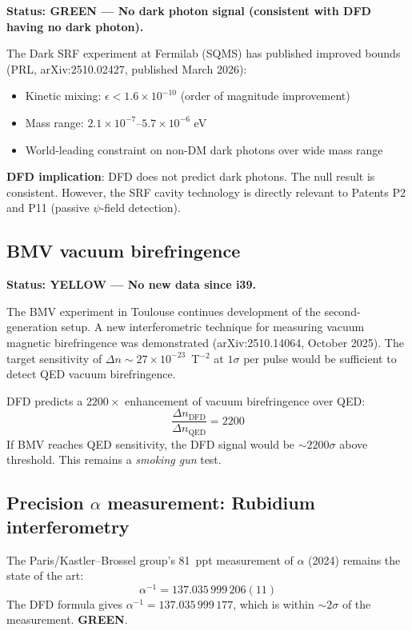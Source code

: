\documentclass[11pt,a4paper]{article}
\newcommand{\GREEN}{\textcolor{dfdgreen}{\textbf{GREEN}}}
\newcommand{\YELLOW}{\textcolor{dfdyellow}{\textbf{YELLOW}}}
\begin{document}
\textbf{Status: \GREEN{} --- No dark photon signal (consistent with DFD having no dark photon).}

The Dark SRF experiment at Fermilab (SQMS) has published improved bounds (PRL, arXiv:2510.02427, published March 2026):
\begin{itemize}
\item Kinetic mixing: $\epsilon < 1.6 \times 10^{-10}$ (order of magnitude improvement)
\item Mass range: $2.1 \times 10^{-7}$--$5.7 \times 10^{-6}$ eV
\item World-leading constraint on non-DM dark photons over wide mass range
\end{itemize}

\textbf{DFD implication}: DFD does not predict dark photons. The null result is consistent. However, the SRF cavity technology is directly relevant to Patents P2 and P11 (passive $\psi$-field detection).

\subsection{BMV vacuum birefringence}

\textbf{Status: \YELLOW{} --- No new data since i39.}

The BMV experiment in Toulouse continues development of the second-generation setup. A new interferometric technique for measuring vacuum magnetic birefringence was demonstrated (arXiv:2510.14064, October 2025). The target sensitivity of $\Delta n \sim 27 \times 10^{-23}$~T$^{-2}$ at $1\sigma$ per pulse would be sufficient to detect QED vacuum birefringence.

DFD predicts a $2200\times$ enhancement of vacuum birefringence over QED:
\begin{equation}
\frac{\Delta n_{\text{DFD}}}{\Delta n_{\text{QED}}} = 2200
\end{equation}
If BMV reaches QED sensitivity, the DFD signal would be $\sim 2200\sigma$ above threshold. This remains a \emph{smoking gun} test.

\subsection{Precision $\alpha$ measurement: Rubidium interferometry}

The Paris/Kastler--Brossel group's 81~ppt measurement of $\alpha$ (2024) remains the state of the art:
\begin{equation}
\alpha^{-1} = 137.035\,999\,206(11)
\end{equation}
The DFD formula gives $\alpha^{-1} = 137.035\,999\,177$, which is within $\sim 2\sigma$ of the measurement. \GREEN{}.
\end{document}
